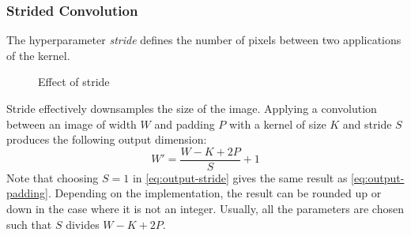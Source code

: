 \subsubsection{Strided Convolution}
\begin{definition}[Stride]
    The hyperparameter \emph{stride} defines the number of pixels between two applications of the kernel.
\end{definition}
\begin{figure}
    \centering
    \caption{Effect of stride}
\end{figure}

Stride effectively downsamples the size of the image. Applying a convolution between an image of width $W$ and padding $P$ with a kernel of size $K$ and stride $S$ produces the following output dimension:
\begin{equation}
    \label{eq:output-stride}
    W'=\frac{W-K+2P}{S}+1
\end{equation}
Note that choosing $S=1$ in \eqref{eq:output-stride} gives the same result as \eqref{eq:output-padding}. Depending on the implementation, the result can be rounded up or down in the case where it is not an integer. Usually, all the parameters are chosen such that $S$ divides $W-K+2P$.

